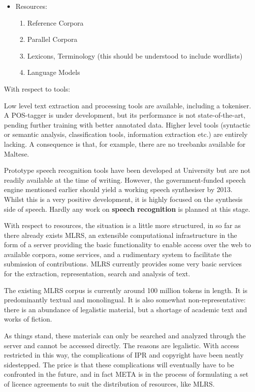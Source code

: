 \documentclass[]{../../metanetpaper}
\begin{document}
\begin{multicols}{2}
\begin{itemize}
\item Resources:
\begin{enumerate}
\item Reference Corpora
\item Parallel Corpora
\item Lexicons, Terminology (this should be understood to include wordlists)
\item Language Models
\end{enumerate}
\end{itemize}

With respect to tools:

Low level text extraction and processing tools are available, including a tokeniser. A POS-tagger is under development, but its performance is not state-of-the-art, pending further training with better annotated data. 
Higher level tools (syntactic or semantic analysis, classification tools, information extraction etc.) are entirely lacking. A consequence is that, for example, there are no treebanks available for Maltese.

Prototype speech recognition tools have been developed at University but are not readily available at the time of writing. However, the government-funded speech engine mentioned earlier should yield a working speech synthesiser by 2013. Whilst this is a very positive development, it is highly focused on the synthesis side of speech. Hardly any work on \textbf{speech recognition} is planned at this stage.

With respect to resources, the situation is a little more structured, in so far as there already exists MLRS, an extensible computational infrastructure in the form of a server providing the basic functionality to enable access over the web to available corpora, some services, and a rudimentary system to facilitate the submission of contributions. MLRS currently provides some very basic services for the extraction, representation, search and analysis of text.

The existing MLRS corpus is currently around 100 million tokens in length. It is predominantly textual and monolingual. It is also somewhat non-representative: there is an abundance of legalistic material, but a shortage of academic text and works of fiction.

As things stand, these materials can only be searched and analyzed through the server and cannot be accessed directly. The reasons are legalistic. With access restricted in this way, the complications of IPR and copyright have been neatly sidestepped. The price is that these complications will eventually have to be confronted in the future, and in fact META is in the process of formulating a set of licence agreements to suit the distribution of resources, like MLRS.



\end{multicols}
\end{document}
